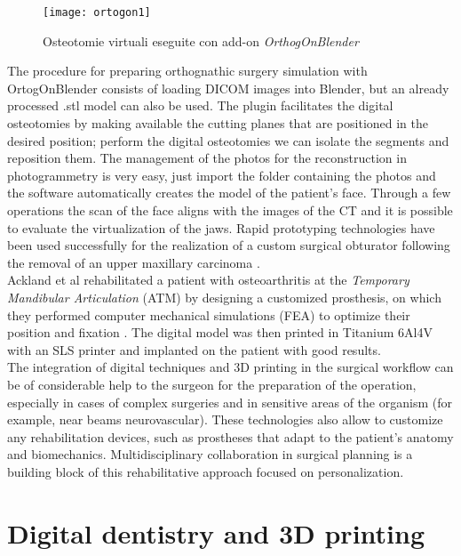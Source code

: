 \begin{figure}[h]
\vspace{-10pt}
	\begin{center}
	\texttt{[image: ortogon1]}
    \caption{Osteotomie virtuali eseguite con add-on \emph{OrthogOnBlender}}
    \label{fig:ortogon1}
    \end{center}
\vspace{-20pt}
\end{figure}

The procedure for preparing orthognathic surgery simulation with OrtogOnBlender \parencite{Reference80} consists of loading DICOM images into Blender, but an already processed .stl model can also be used. The plugin facilitates the digital osteotomies by making available the cutting planes that are positioned in the desired position; perform the digital osteotomies we can isolate the segments and reposition them.
The management of the photos for the reconstruction in photogrammetry is very easy, just import the folder containing the photos and the software automatically creates the model of the patient's face. Through a few operations the scan of the face aligns with the images of the CT and it is possible to evaluate the virtualization of the jaws.
Rapid prototyping technologies have been used successfully for the realization of a custom surgical obturator following the removal of an upper maxillary carcinoma \parencite{Reference81}. \\
Ackland et al \parencite{Reference82} rehabilitated a patient with osteoarthritis at the \emph{Temporary Mandibular Articulation} (ATM) by designing a customized prosthesis, on which they performed computer mechanical simulations (FEA) to optimize their position and fixation . The digital model was then printed in Titanium 6Al4V with an SLS printer and implanted on the patient with good results. \\
The integration of digital techniques and 3D printing in the surgical workflow can be of considerable help to the surgeon for the preparation of the operation, especially in cases of complex surgeries and in sensitive areas of the organism (for example, near beams neurovascular). These technologies also allow to customize any rehabilitation devices, such as prostheses that adapt to the patient's anatomy and biomechanics. Multidisciplinary collaboration in surgical planning is a building block of this rehabilitative approach focused on personalization.


\section{Digital dentistry and 3D printing}

